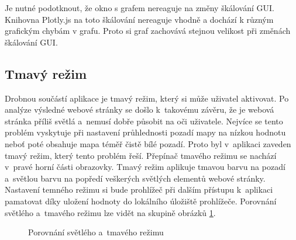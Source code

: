 Je nutné podotknout, že okno s grafem nereaguje na změny škálování GUI. Knihovna Plotly.js na toto škálování nereaguje vhodně a dochází k různým grafickým chybám v grafu. Proto si graf zachovává stejnou velikost při změnách škálování GUI. 

\subsection{Tmavý režim}

Drobnou součástí aplikace je tmavý režim, který si může uživatel aktivovat. Po analýze výsledné webové stránky se došlo k~takovému závěru, že je webová stránka příliš světlá a~nemusí dobře působit na oči uživatele. Nejvíce se tento problém vyskytuje při nastavení průhlednosti pozadí mapy na nízkou hodnotu neboť poté obsahuje mapa téměř čistě bílé pozadí. Proto byl v~aplikaci zaveden tmavý režim, který tento problém řeší. Přepínač tmavého režimu se nachází v~pravé horní části obrazovky. Tmavý režim aplikuje tmavou barvu na pozadí a~světlou barvu na popředí veškerých světlých elementů webové stránky. Nastavení temného režimu si bude prohlížeč při dalším přístupu k~aplikaci pamatovat díky uložení hodnoty do lokálního úložiště prohlížeče. Porovnání světlého a~tmavého režimu lze vidět na skupině obrázků \ref{fig:WhiteDarkMode}.
\vspace*{0.5in}
\begin{figure}[h]
\centering
{}\hfill
{}
\caption{Porovnání světlého a~tmavého režimu}
\label{fig:WhiteDarkMode}

\end{figure}

